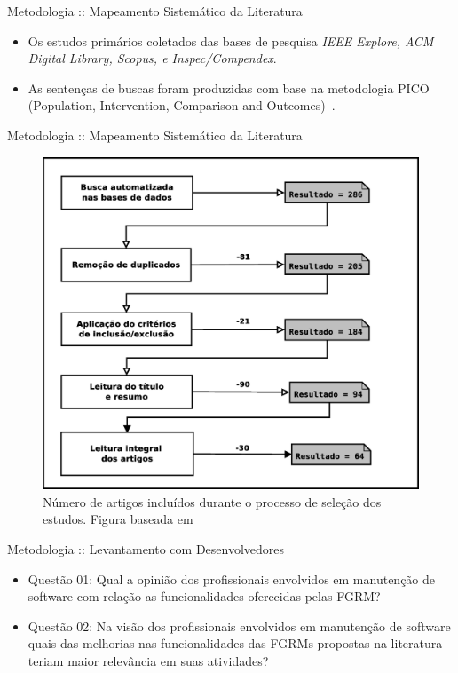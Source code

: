 \documentclass[t,14pt,mathserif]{beamer}
\begin{document}
\begin{frame}{Metodologia :: Mapeamento Sistemático da Literatura}

    \begin{itemize}
       \item Os estudos primários coletados das bases de pesquisa \textit{IEEE
             Explore, ACM Digital Library, Scopus, e Inspec/Compendex}.
     \item As sentenças de buscas foram produzidas com base na metodologia PICO
          (Population, Intervention, Comparison and
          Outcomes)~\cite{keele2007guidelines}.
    \end{itemize}

\end{frame}

\begin{frame}{Metodologia :: Mapeamento Sistemático da Literatura}

            \begin{figure} \centering \includegraphics[width=0.45\linewidth]
        {../img/diagrama-processo-selecao.eps}
        \caption{Número de artigos incluídos durante o processo de seleção dos
            estudos. Figura baseada em~\cite{Petersen2015}}
\label{fig:diagrama-processo-selecao}

    \end{figure}
\end{frame}

\begin{frame}{Metodologia :: Levantamento com Desenvolvedores}

    \begin{itemize}
        \item Questão 01: Qual a opinião dos profissionais envolvidos em
            manutenção de software com relação as funcionalidades
            oferecidas pelas FGRM\@?
        \item Questão 02: Na visão dos profissionais envolvidos em
            manutenção de software quais das melhorias nas
            funcionalidades das FGRMs propostas na literatura teriam
            maior relevância em suas atividades?
    \end{itemize}

\end{frame}
\end{document}
